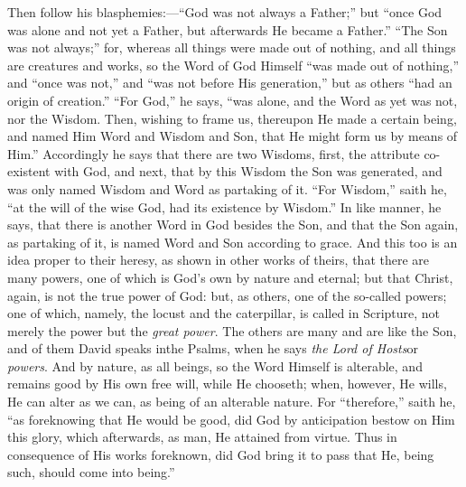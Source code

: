 Then follow his
blasphemies:—``God was not always a Father;'' but ``once God was alone
and not yet a Father, but afterwards He became a Father.'' ``The Son was
not always;'' for, whereas all things were made out of nothing, and all
things are creatures and works, so the Word of God Himself ``was made
out of nothing,'' and ``once was not,'' and ``was not before His
generation,'' but as others ``had an origin of creation.'' ``For God,'' he
says, ``was alone, and the Word as yet was not, nor the Wisdom. Then,
wishing to frame us, thereupon He made a certain being, and
named Him Word and Wisdom and Son, that He might form us by means of
Him.'' Accordingly he says that there are two Wisdoms, first, the
attribute co-existent with God, and next, that by this Wisdom the Son
was generated, and was only named Wisdom and Word as partaking of it. ``For
Wisdom,'' saith he, ``at the will of the wise God, had its existence by
Wisdom.'' In like manner, he says, that there is another Word in God
besides the Son, and that the Son again, as partaking of it, is named
Word and Son according to grace. And this too is an idea proper to
their heresy, as shown in other works of theirs, that there are many
powers, one of which is God's own by nature and eternal; but that
Christ, again, is not the true power of God: but, as others, one of
the so-called powers; one of which, namely, the locust and the
caterpillar, is called in Scripture, not merely the power but the \emph{great
power}. The others are many and are like the Son, and of them David
speaks in\emph{}the Psalms, when he says \emph{the Lord of Hosts}or \emph{powers}.
And by nature, as all beings, so the Word Himself is alterable, and
remains good by His own free will, while He chooseth; when, however,
He wills, He can alter as we can, as being of an alterable nature. For
``therefore,'' saith he, ``as foreknowing that He would be good, did God
by anticipation bestow on Him this glory, which afterwards, as man, He
attained from virtue. Thus in consequence of His works foreknown, did
God bring it to pass that He, being such, should come into being.''

